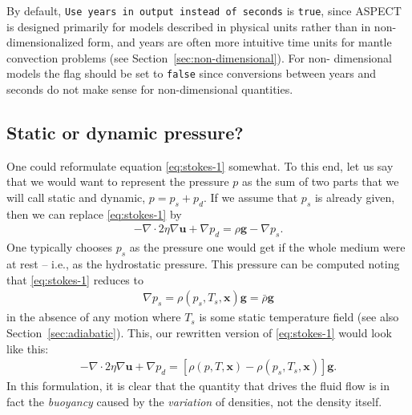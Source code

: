 \documentclass{article}
\newcommand{\aspect}{\textsc{ASPECT}}
\begin{document}
By default, \texttt{Use years in output instead of seconds} is \texttt{true},
since \aspect{} is designed primarily for models described in physical units rather
than in non-dimensionalized form, and years are often more intuitive time units
for mantle convection problems (see Section~\ref{sec:non-dimensional}). For non-
dimensional models the flag should be set to \texttt{false} since conversions
between years and seconds do not make sense for non-dimensional quantities.

\subsection{Static or dynamic pressure?}
\label{sec:pressure-static-dyn}

One could reformulate equation \eqref{eq:stokes-1} somewhat. To this end, let us
say that we would want to represent the pressure $p$ as the sum of two parts
that we will call static and dynamic, $p=p_s+p_d$. If we assume that $p_s$ is
already given, then we can replace \eqref{eq:stokes-1} by
\begin{gather*}
  -\nabla \cdot 2\eta
  \nabla \mathbf u + \nabla p_d =
  \rho\mathbf g - \nabla p_s.
\end{gather*}
One typically chooses $p_s$ as the pressure one would get if the whole medium
were at rest -- i.e., as the hydrostatic pressure. This pressure can be
computed noting that \eqref{eq:stokes-1} reduces to
\begin{gather*}
  \nabla p_s = \rho(p_s,T_s,\mathbf x)\mathbf g = \bar\rho \mathbf g
\end{gather*}
in the absence of any motion where $T_s$ is some static temperature field (see
also Section~\ref{sec:adiabatic}). This, our rewritten version of
\eqref{eq:stokes-1} would look like this:
\begin{gather*}
  -\nabla \cdot 2\eta
  \nabla \mathbf u + \nabla p_d =
  \left[\rho(p,T,\mathbf x)-\rho(p_s,T_s,\mathbf x)\right]\mathbf g.
\end{gather*}
In this
formulation, it is clear that the quantity that drives the fluid flow is in
fact the \textit{buoyancy} caused by the \textit{variation} of densities,
not the density itself.
\end{document}
